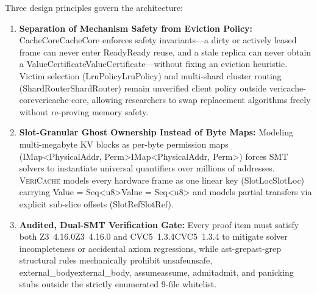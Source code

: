 \documentclass[11pt,a4paper]{article}
\let\origunderscore\_
\DeclareRobustCommand{\code}[1]{{\ttfamily\ifmmode #1\else\def\_{\origunderscore\hspace{0pt}}#1\fi}}
\newcommand{\VC}{\textsc{VeriCache}}
\begin{document}
Three design principles govern the architecture:
\begin{enumerate}
  \item \textbf{Separation of Mechanism Safety from Eviction Policy:} \code{CacheCore} enforces safety invariants---a dirty or actively leased frame can never enter \code{Ready} reuse, and a stale replica can never obtain a \code{ValueCertificate}---without fixing an eviction heuristic. Victim selection (\code{LruPolicy}) and multi-shard cluster routing (\code{ShardRouter}) remain unverified client policy outside \code{vericache-core}, allowing researchers to swap replacement algorithms freely without re-proving memory safety.
  \item \textbf{Slot-Granular Ghost Ownership Instead of Byte Maps:} Modeling multi-megabyte KV blocks as per-byte permission maps (\code{IMap<PhysicalAddr, Perm>}) forces SMT solvers to instantiate universal quantifiers over millions of addresses. \VC{} models every hardware frame as one linear key (\code{SlotLoc}) carrying \code{Value = Seq<u8>} and models partial transfers via explicit sub-slice offsets (\code{SlotRef}).
  \item \textbf{Audited, Dual-SMT Verification Gate:} Every proof item must satisfy both \code{Z3~4.16.0} and \code{CVC5~1.3.4} to mitigate solver incompleteness or accidental axiom regressions, while \code{ast-grep} structural rules mechanically prohibit \code{unsafe}, \code{external\_body}, \code{assume}, \code{admit}, and panicking stubs outside the strictly enumerated 9-file whitelist.
\end{enumerate}
\end{document}
